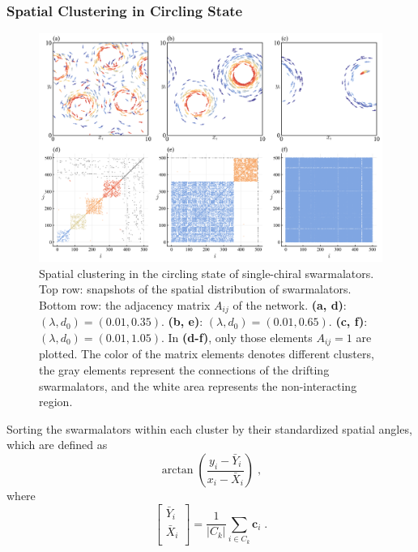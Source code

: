 \documentclass{article}
\begin{document}
\subsubsection{Spatial Clustering in Circling State}

\begin{figure}[H]
    \includegraphics[width=\textwidth]{./figs/mono_CS_Aij.png}
    \caption{
        \label{fig:mono_CS_Aij}
        Spatial clustering in the circling state of single-chiral swarmalators. 
        Top row: snapshots of the spatial distribution of swarmalators. Bottom row: the adjacency matrix $A_{ij}$ of the network. 
        \textbf{(a, d)}: $(\lambda, d_0)=(0.01, 0.35)$.
        \textbf{(b, e)}: $(\lambda, d_0)=(0.01, 0.65)$.
        \textbf{(c, f)}: $(\lambda, d_0)=(0.01, 1.05)$.
        In \textbf{(d-f)}, only those elements $A_{ij}=1$ are plotted. The color of the matrix elements denotes different clusters, the gray elements represent the connections of the drifting swarmalators, and the white area represents the non-interacting region.
    }
\end{figure}

Sorting the swarmalators within each cluster by their standardized spatial angles, which are defined as
\begin{equation}
    \arctan \left( \frac{y_i-\bar{Y}_i}{x_i-\bar{X}_i} \right)\;,
\end{equation}
where 
\begin{equation}
    \left[ \begin{array}{c}
        \bar{Y}_i\\
        \bar{X}_i\\
    \end{array} \right] =\frac{1}{\left| C_k \right|}\sum_{i\in C_k}{\mathbf{c}_i}\;.
\end{equation}
\end{document}
